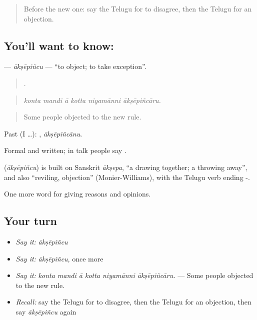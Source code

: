\label{lesson:TE-C386-aksepincu}



\begin{quote}
Before the new one: say the Telugu for to disagree, then the Telugu for an objection.
\end{quote}

\subsection*{You'll want to know: }
\textbf{} — \emph{ākṣēpiñcu} — \textquotedblleft{}to object; to take exception\textquotedblright{}.

\begin{quote}
     .
\end{quote}

\begin{quote}
\emph{konta mandi ā kotta niyamānni ākṣēpiñcāru.}
\end{quote}

\begin{quote}
Some people objected to the new rule.
\end{quote}

Past (I …): , \emph{ākṣēpiñcānu}.

Formal and written; in talk people say  .

\begin{cousinweb}
\textbf{} (\emph{ākṣēpiñcu}) is built on Sanskrit \emph{ākṣepa}, \textquotedblleft{}a drawing together; a throwing away\textquotedblright{}, and also \textquotedblleft{}reviling, objection\textquotedblright{} (Monier-Williams), with the Telugu verb ending -.
\end{cousinweb}

\begin{grammarlens}[title={What you've built}]
One more word for giving reasons and opinions.
\end{grammarlens}

\subsection*{Your turn}
\begin{itemize}
\raggedright
  \item \emph{Say it:} \emph{ākṣēpiñcu}
  \item \emph{Say it:} \emph{ākṣēpiñcu}, once more
  \item \emph{Say it:} \emph{konta mandi ā kotta niyamānni ākṣēpiñcāru.} — Some people objected to the new rule.
  \item \emph{Recall:} say the Telugu for to disagree, then the Telugu for an objection, then say \emph{ākṣēpiñcu} again
\end{itemize}

